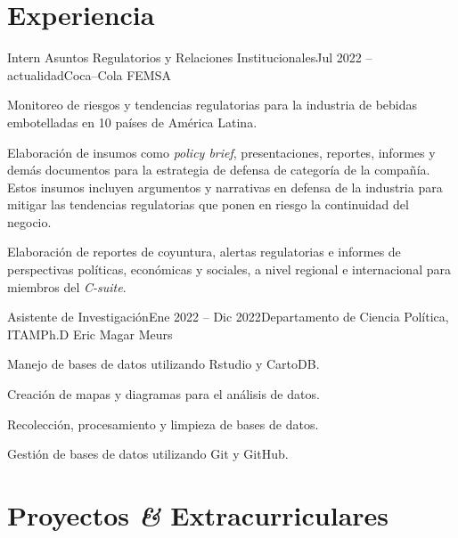 \documentclass[letter]{resume}
\begin{document}
\section{Experiencia}
\begin{content}

\begin{position}{Intern Asuntos Regulatorios y Relaciones Institucionales}{Jul 2022 -- actualidad}{Coca–Cola FEMSA}{}{}
  \item Monitoreo de riesgos y tendencias regulatorias para la industria de bebidas embotelladas en 10 países de América Latina.
  \item Elaboración de insumos como \emph{policy brief}, presentaciones, reportes, informes y demás documentos para la estrategia de defensa de categoría de la compañía. Estos insumos incluyen argumentos y narrativas en defensa de la industria para mitigar las tendencias regulatorias que ponen en riesgo la continuidad del negocio. 
  \item Elaboración de reportes de coyuntura, alertas regulatorias e informes de perspectivas políticas, económicas y sociales, a nivel regional e internacional para miembros del \emph{C-suite}.
\end{position}
\vspace{-.0001 \baselineskip}

\begin{position}{Asistente de Investigación}{Ene 2022 -- Dic 2022}{Departamento de Ciencia Política, ITAM}{Ph.D Eric Magar Meurs}{}
  \item Manejo de bases de datos utilizando Rstudio y CartoDB.
  \item Creación de mapas y diagramas para el análisis de datos.
  \item Recolección, procesamiento y limpieza de bases de datos.
  \item Gestión de bases de datos utilizando Git y GitHub.
\end{position}
\vspace{-.0001 \baselineskip}

\sectionlineskip
\end{content}

\section{Proyectos \textbf{\em\&} Extracurriculares}
\end{document}
